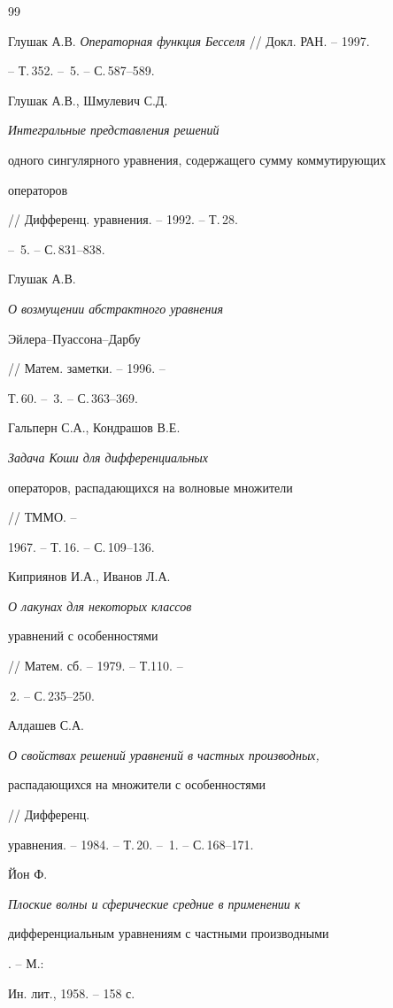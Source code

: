 \begin{thebibliography}{99} 


 




Глушак А.В. {\em Операторная функция Бесселя} // Докл. РАН. -- 1997.


-- Т.\,352. -- \No\,5. -- С.\,587--589. 




Глушак А.В., Шмулевич С.Д. {\em Интегральные представления решений 


одного сингулярного уравнения, содержащего сумму коммутирующих 


операторов} // Дифференц. уравнения. -- 1992. -- Т.\,28. 


-- \No\,5. -- С.\,831--838. 




Глушак А.В. {\em О возмущении абстрактного уравнения 


Эйлера--Пуассона--Дарбу} // Матем. заметки. -- 1996. -- 


Т.\,60. -- \No\,3. -- С.\,363--369. 




Гальперн С.А., Кондрашов В.Е. {\em Задача Коши для дифференциальных 


операторов, распадающихся на волновые множители} // ТММО. -- 


1967. -- Т.\,16. -- С.\,109--136. 




Киприянов И.А., Иванов Л.А. {\em О лакунах для некоторых классов 


уравнений с особенностями} // Матем. сб. -- 1979. -- Т.110. --


\No\,2. -- С.\,235--250. 




Алдашев С.А. {\em О свойствах решений уравнений в частных производных, 


распадающихся на множители с особенностями} // Дифференц.  


уравнения. -- 1984. -- Т.\,20. -- \No\,1. -- С.\,168--171. 




Йон Ф. {\em Плоские волны и сферические средние в применении к 


дифференциальным уравнениям с частными производными}. -- М.: 


Ин. лит., 1958. -- 158 с. 



\end{thebibliography}
